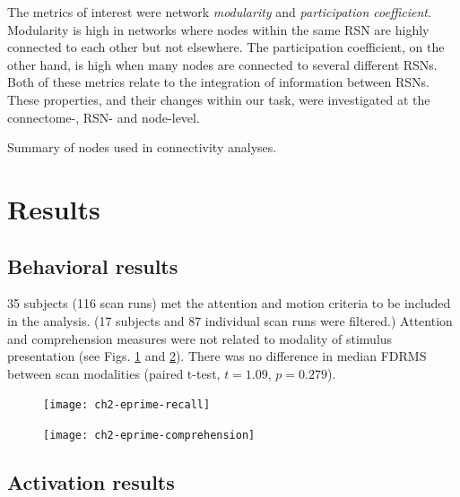The metrics of interest were network \textit{modularity} and \textit{participation coefficient}. Modularity is high in networks where nodes within the same RSN are highly connected to each other but not elsewhere. The participation coefficient, on the other hand, is high when many nodes are connected to several different RSNs. Both of these metrics relate to the integration of information between RSNs. These properties, and their changes within our task, were investigated at the connectome-, RSN- and node-level. 

\begin{table}
	\scriptsize
	\renewcommand{\tabcolsep}{0.09cm}
	\centering
	
	\caption{Summary of nodes used in connectivity analyses.}
	\label{table:ch2-power-nodes}
\end{table}

\section{Results}

\subsection{Behavioral results}

35 subjects (116 scan runs) met the attention and motion criteria to be included in the analysis. (17 subjects and 87 individual scan runs were filtered.) Attention and comprehension measures were not related to modality of stimulus presentation (see Figs. \ref{fig:ch2-eprime-recall} and \ref{fig:ch2-eprime-comprehension}). There was no difference in median FDRMS between scan modalities (paired t-test, $t = 1.09$, $p = 0.279$).  

\begin{figure}[tp]
	\centering
	\texttt{[image: ch2-eprime-recall]}
    \caption[Post-scanner recall was not related to modality.]{}
	\label{fig:ch2-eprime-recall}
\end{figure}

\begin{figure}[tp]
	\centering
	\texttt{[image: ch2-eprime-comprehension]}
    \caption[In-scanner comprehension performance did not differ by modality.]{}
	\label{fig:ch2-eprime-comprehension}
\end{figure}

\subsection{Activation results}

